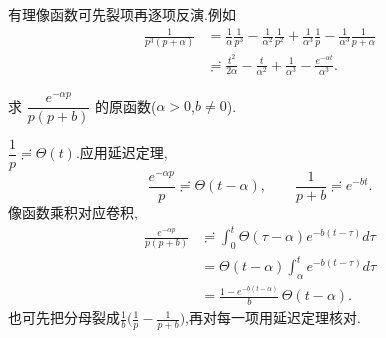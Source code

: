 有理像函数可先裂项再逐项反演.例如
\begin{equation}
    \begin{aligned}
    \frac{1}{p^3(p+\alpha)}
    & =\frac{1}{\alpha} \frac{1}{p^3}-\frac{1}{\alpha^2} \frac{1}{p^2}+\frac{1}{\alpha^3} \frac{1}{p}-\frac{1}{\alpha^3} \frac{1}{p+\alpha} \\
    & \risingdotseq \frac{t^2}{2 \alpha}-\frac{t}{\alpha^2}+\frac{1}{\alpha^3}-\frac{e^{-\alpha t}}{\alpha^3}.
    \end{aligned}
\end{equation}

\begin{example}
求 $\dfrac{e^{-\alpha p}}{p(p+b)}$ 的原函数($\alpha>0$,$b\neq 0$).
\end{example}
\begin{solution}
$\dfrac{1}{p} \risingdotseq \Theta(t)$.应用延迟定理,
\[
\frac{e^{-\alpha p}}{p} \risingdotseq \Theta(t-\alpha),
\qquad
\frac{1}{p+b} \risingdotseq e^{-b t}.
\]
像函数乘积对应卷积,
\begin{equation}
\begin{aligned}
\frac{e^{-\alpha p}}{p(p+b)}
& \risingdotseq \int_0^t \Theta(\tau-\alpha) e^{-b(t-\tau)} d \tau \\
& =\Theta(t-\alpha) \int_\alpha^t e^{-b(t-\tau)} d \tau \\
& =\frac{1-e^{-b(t-\alpha)}}{b}\,\Theta(t-\alpha).
\end{aligned}
\end{equation}
也可先把分母裂成$\frac{1}{b}\bigl(\frac{1}{p}-\frac{1}{p+b}\bigr)$,再对每一项用延迟定理核对.
\end{solution}
